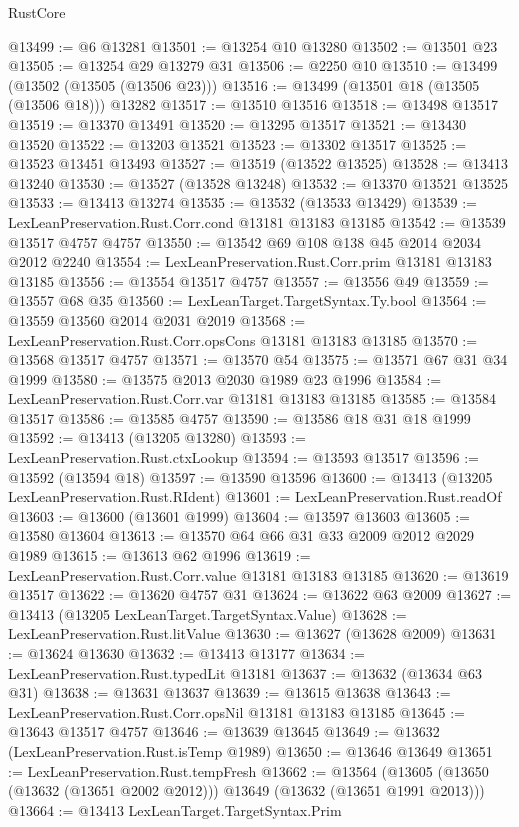 \begin{lexlean}{RustCore}
\begin{coremodule}
@13499 := @6 @13281
@13501 := @13254 @10 @13280
@13502 := @13501 @23
@13505 := @13254 @29 @13279 @31
@13506 := @2250 @10
@13510 := @13499 (@13502 (@13505 (@13506 @23)))
@13516 := @13499 (@13501 @18 (@13505 (@13506 @18))) @13282
@13517 := @13510 @13516
@13518 := @13498 @13517
@13519 := @13370 @13491
@13520 := @13295 @13517
@13521 := @13430 @13520
@13522 := @13203 @13521
@13523 := @13302 @13517
@13525 := @13523 @13451 @13493
@13527 := @13519 (@13522 @13525)
@13528 := @13413 @13240
@13530 := @13527 (@13528 @13248)
@13532 := @13370 @13521 @13525
@13533 := @13413 @13274
@13535 := @13532 (@13533 @13429)
@13539 := LexLeanPreservation.Rust.Corr.cond @13181 @13183 @13185
@13542 := @13539 @13517 @4757 @4757
@13550 := @13542 @69 @108 @138 @45 @2014 @2034 @2012 @2240
@13554 := LexLeanPreservation.Rust.Corr.prim @13181 @13183 @13185
@13556 := @13554 @13517 @4757
@13557 := @13556 @49
@13559 := @13557 @68 @35
@13560 := LexLeanTarget.TargetSyntax.Ty.bool
@13564 := @13559 @13560 @2014 @2031 @2019
@13568 := LexLeanPreservation.Rust.Corr.opsCons @13181 @13183 @13185
@13570 := @13568 @13517 @4757
@13571 := @13570 @54
@13575 := @13571 @67 @31 @34 @1999
@13580 := @13575 @2013 @2030 @1989 @23 @1996
@13584 := LexLeanPreservation.Rust.Corr.var @13181 @13183 @13185
@13585 := @13584 @13517
@13586 := @13585 @4757
@13590 := @13586 @18 @31 @18 @1999
@13592 := @13413 (@13205 @13280)
@13593 := LexLeanPreservation.Rust.ctxLookup
@13594 := @13593 @13517
@13596 := @13592 (@13594 @18)
@13597 := @13590 @13596
@13600 := @13413 (@13205 LexLeanPreservation.Rust.RIdent)
@13601 := LexLeanPreservation.Rust.readOf
@13603 := @13600 (@13601 @1999)
@13604 := @13597 @13603
@13605 := @13580 @13604
@13613 := @13570 @64 @66 @31 @33 @2009 @2012 @2029 @1989
@13615 := @13613 @62 @1996
@13619 := LexLeanPreservation.Rust.Corr.value @13181 @13183 @13185
@13620 := @13619 @13517
@13622 := @13620 @4757 @31
@13624 := @13622 @63 @2009
@13627 := @13413 (@13205 LexLeanTarget.TargetSyntax.Value)
@13628 := LexLeanPreservation.Rust.litValue
@13630 := @13627 (@13628 @2009)
@13631 := @13624 @13630
@13632 := @13413 @13177
@13634 := LexLeanPreservation.Rust.typedLit @13181
@13637 := @13632 (@13634 @63 @31)
@13638 := @13631 @13637
@13639 := @13615 @13638
@13643 := LexLeanPreservation.Rust.Corr.opsNil @13181 @13183 @13185
@13645 := @13643 @13517 @4757
@13646 := @13639 @13645
@13649 := @13632 (LexLeanPreservation.Rust.isTemp @1989)
@13650 := @13646 @13649
@13651 := LexLeanPreservation.Rust.tempFresh
@13662 := @13564
    (@13605 (@13650 (@13632 (@13651 @2002 @2012))) @13649 (@13632 (@13651 @1991 @2013)))
@13664 := @13413 LexLeanTarget.TargetSyntax.Prim

\end{coremodule}
\end{lexlean}
